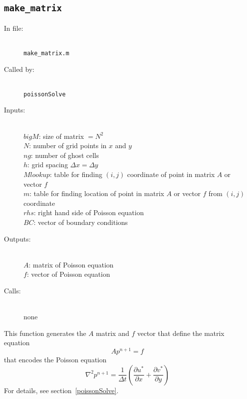 \documentclass[12pt]{article}
\begin{document}
\subsection{\texttt{make\_matrix}}
\begin{description}
\item[In file:] \hfill \\ \texttt{make\_matrix.m}
\item[Called by:] \hfill \\ \texttt{poissonSolve}
\item[Inputs:] \hfill \\ $bigM$: size of matrix $= N^2$ \\ $N$: number of grid points in $x$ and $y$ \\ $ng$: number of ghost cells \\ $h$: grid spacing $\Delta x = \Delta y$ \\ $Mlookup$: table for finding $(i,j)$ coordinate of point in matrix $A$ or vector $f$ \\ $m$: table for finding location of point in matrix $A$ or vector $f$ from $(i,j)$ coordinate \\ $rhs$: right hand side of Poisson equation \\ $BC$: vector of boundary conditions
\item[Outputs:] \hfill \\ $A$: matrix of Poisson equation \\ $f$: vector of Poisson equation
\item[Calls:] \hfill \\ none
\end{description}
This function generates the $A$ matrix and $f$ vector that define the matrix equation
\[ Ap^{n+1} = f\]
that encodes the Poisson equation
\[ \nabla^2 p^{n+1} = \frac{1}{\Delta t}\left( \frac{\partial u^*}{\partial x} + \frac{\partial v^*}{\partial y} \right) \]
For details, see section~\ref{poissonSolve}.
\end{document}
